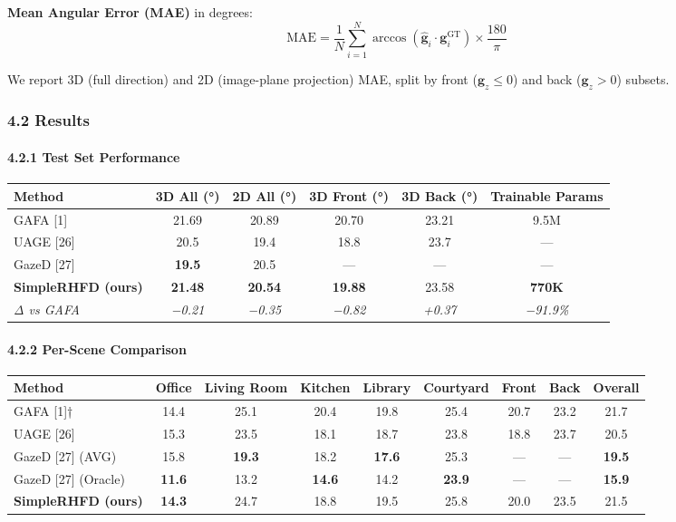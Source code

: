 \documentclass[
]{article}
\begin{document}
\textbf{Mean Angular Error (MAE)} in degrees:
\[\text{MAE} = \frac{1}{N}\sum_{i=1}^{N} \arccos(\hat{\mathbf{g}}_i \cdot \mathbf{g}_i^{\text{GT}}) \times \frac{180}{\pi}\]

We report 3D (full direction) and 2D (image-plane projection) MAE, split
by front (\(\mathbf{g}_z \leq 0\)) and back (\(\mathbf{g}_z > 0\))
subsets.

\hypertarget{results}{%
\subsubsection{4.2 Results}\label{results}}

\hypertarget{test-set-performance}{%
\paragraph{4.2.1 Test Set Performance}\label{test-set-performance}}

\begin{longtable}[]{@{}lccccc@{}}
\toprule
Method & 3D All (°) & 2D All (°) & 3D Front (°) & 3D Back (°) &
Trainable Params \\
\midrule
\endhead
GAFA {[}1{]} & 21.69 & 20.89 & 20.70 & 23.21 & 9.5M \\
UAGE {[}26{]} & 20.5 & 19.4 & 18.8 & 23.7 & --- \\
GazeD {[}27{]} & \textbf{19.5} & 20.5 & --- & --- & --- \\
\textbf{SimpleRHFD (ours)} & \textbf{21.48} & \textbf{20.54} &
\textbf{19.88} & 23.58 & \textbf{770K} \\
\emph{Δ vs GAFA} & \emph{−0.21} & \emph{−0.35} & \emph{−0.82} &
\emph{+0.37} & \emph{−91.9\%} \\
\bottomrule
\end{longtable}

\hypertarget{per-scene-comparison}{%
\paragraph{4.2.2 Per-Scene Comparison}\label{per-scene-comparison}}

\begin{longtable}[]{@{}lcccccccc@{}}
\toprule
Method & Office & Living Room & Kitchen & Library & Courtyard & Front &
Back & Overall \\
\midrule
\endhead
GAFA {[}1{]}† & 14.4 & 25.1 & 20.4 & 19.8 & 25.4 & 20.7 & 23.2 & 21.7 \\
UAGE {[}26{]} & 15.3 & 23.5 & 18.1 & 18.7 & 23.8 & 18.8 & 23.7 & 20.5 \\
GazeD {[}27{]} (AVG) & 15.8 & \textbf{19.3} & 18.2 & \textbf{17.6} &
25.3 & --- & --- & \textbf{19.5} \\
GazeD {[}27{]} (Oracle) & \textbf{11.6} & 13.2 & \textbf{14.6} & 14.2 &
\textbf{23.9} & --- & --- & \textbf{15.9} \\
\textbf{SimpleRHFD (ours)} & \textbf{14.3} & 24.7 & 18.8 & 19.5 & 25.8 &
20.0 & 23.5 & 21.5 \\
\bottomrule
\end{longtable}
\end{document}
